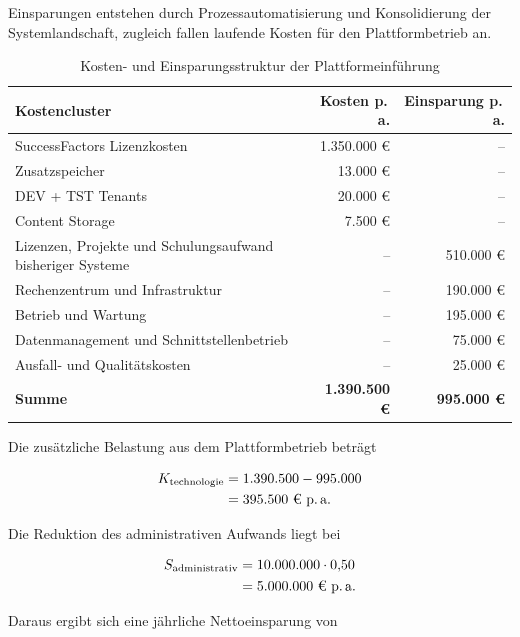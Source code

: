 Einsparungen entstehen durch Prozessautomatisierung und Konsolidierung der
Systemlandschaft, zugleich fallen laufende Kosten für den Plattformbetrieb an.

\begin{xltabular}{\textwidth}{@{}Xrr@{}}
  \caption{Kosten- und Einsparungsstruktur der Plattformeinführung} \label{tab:kosten-einsparungen} \\
  \toprule
  \textbf{Kostencluster} & \textbf{Kosten p.\,a.} & \textbf{Einsparung p.\,a.} \\
  \midrule
  SuccessFactors Lizenzkosten & 1.350.000 € & -- \\
  Zusatzspeicher & 13.000 € & -- \\
  DEV + TST Tenants & 20.000 € & -- \\
  Content Storage & 7.500 € & -- \\

  \midrule

  Lizenzen, Projekte und Schulungsaufwand bisheriger Systeme & -- & 510.000 € \\
  Rechenzentrum und Infrastruktur & -- & 190.000 € \\
  Betrieb und Wartung & -- & 195.000 € \\
  Datenmanagement und Schnittstellenbetrieb & -- & 75.000 € \\
  Ausfall- und Qualitätskosten & -- & 25.000 € \\

  \midrule
  \textbf{Summe} & \textbf{1.390.500 €} & \textbf{995.000 €} \\
  \bottomrule
\end{xltabular}

Die zusätzliche Belastung aus dem Plattformbetrieb beträgt

\begin{align}
K_{\text{technologie}} &= 1.390.500 - 995.000 \\
                       &= 395.500\ \text{€ p.\,a.}
\end{align}

Die Reduktion des administrativen Aufwands liegt bei

\begin{align}
S_{\text{administrativ}} &= 10.000.000 \cdot 0{,}50 \\
                         &= 5.000.000\ \text{€ p.\,a.}
\end{align}

Daraus ergibt sich eine jährliche Nettoeinsparung von

